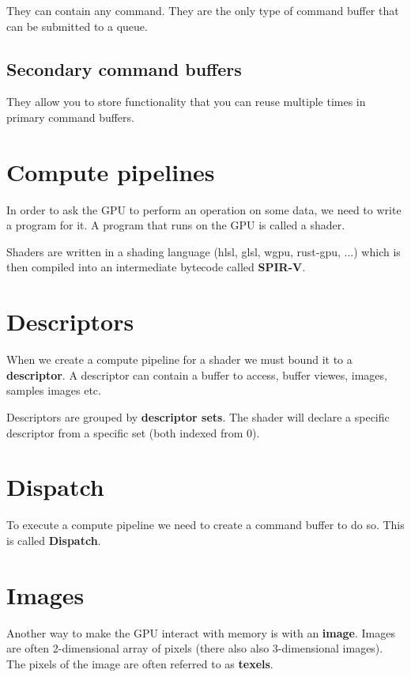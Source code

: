 \documentclass{article}
\begin{document}
They can contain any command.
They are the only type of command buffer that can be submitted to a queue.

\subsection{Secondary command buffers}

They allow you to store functionality that you can reuse multiple times in primary command buffers. 

\section{Compute pipelines}

In order to ask the GPU to perform an operation on some data, we need to write
a program for it. A program that runs on the GPU is called a shader.

Shaders are written in a shading language (hlsl, glsl, wgpu, rust-gpu, ...)
which is then compiled into an intermediate bytecode called \textbf{SPIR-V}.

\section{Descriptors}

When we create a compute pipeline for a shader we must bound it to a \textbf{descriptor}.
A descriptor can contain a buffer to access, buffer viewes, images, samples images etc.

Descriptors are grouped by \textbf{descriptor sets}.
The shader will declare a specific descriptor from a specific set (both indexed from 0).

\section{Dispatch}

To execute a compute pipeline we need to create a command buffer to do so.
This is called \textbf{Dispatch}.


\section{Images}

Another way to make the GPU interact with memory is with an \textbf{image}.
Images are often 2-dimensional array of pixels (there also also 3-dimensional images). The pixels of the image
are often referred to as \textbf{texels}.
\end{document}
